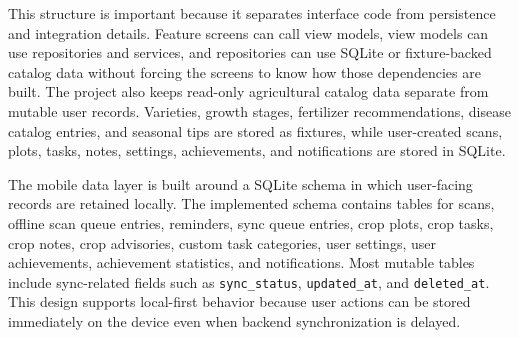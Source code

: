 This structure is important because it separates interface code from persistence and integration
details. Feature screens can call view models, view models can use repositories and services, and
repositories can use SQLite or fixture-backed catalog data without forcing the screens to know how
those dependencies are built. The project also keeps read-only agricultural catalog data separate
from mutable user records. Varieties, growth stages, fertilizer recommendations, disease catalog
entries, and seasonal tips are stored as fixtures, while user-created scans, plots, tasks, notes,
settings, achievements, and notifications are stored in SQLite.


The mobile data layer is built around a SQLite schema in which user-facing records are retained
locally. The implemented schema contains tables for scans, offline scan queue entries, reminders,
sync queue entries, crop plots, crop tasks, crop notes, crop advisories, custom task categories,
user settings, user achievements, achievement statistics, and notifications. Most mutable tables
include sync-related fields such as \texttt{sync\_status}, \texttt{updated\_at}, and
\texttt{deleted\_at}. This design supports local-first behavior because user actions can be stored
immediately on the device even when backend synchronization is delayed.

\begin{table}[H]
\centering
\caption{Implemented mobile local persistence groups}
\label{tab:mobile-local-persistence}
\small
{}
\end{table}

